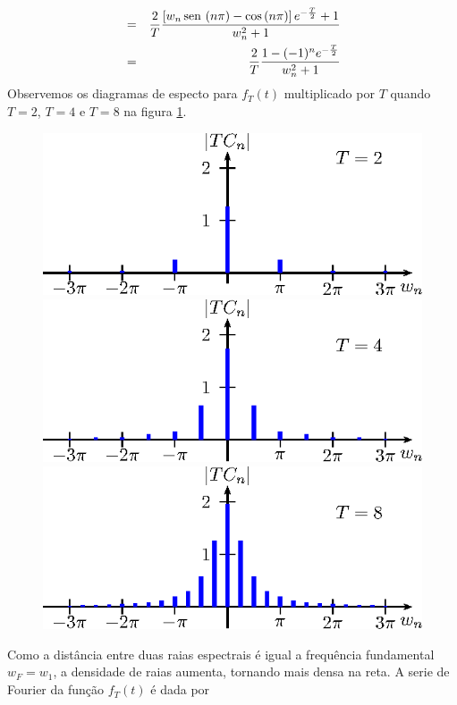 \begin{ex}{\label{ex_Transf_1}}
\begin{eqnarray}
 \nonumber &=&\frac{2}{T}\frac{ \left[w_n \operatorname{sen}\,\left(n\pi\right)-\cos\left(n\pi\right)\right]e^{-\frac{T}{2}}+1}{w_n^2+1}\\
&=&\frac{2}{T}\frac{ 1-(-1)^ne^{-\frac{T}{2}}}{w_n^2+1}      {\label{TCn}}
 \end{eqnarray}
Observemos os diagramas de especto para $f_T(t)$ multiplicado por $T$ quando $T=2$, $T=4$ e $T=8$ na figura \ref{dia_espc_tenda}.
 \begin{figure}[!ht]
\includegraphics{cap_transformada_de_fourier/pics/figura_4}
\includegraphics{cap_transformada_de_fourier/pics/figura_5}
\includegraphics{cap_transformada_de_fourier/pics/figura_6}\caption{\label{dia_espc_tenda}}
\end{figure}
 \end{ex}
Como a distância entre duas raias espectrais é igual a frequência fundamental $w_F=w_1$, a densidade de raias aumenta, tornando mais densa na reta. A serie de Fourier da função $f_T(t)$ é dada por

